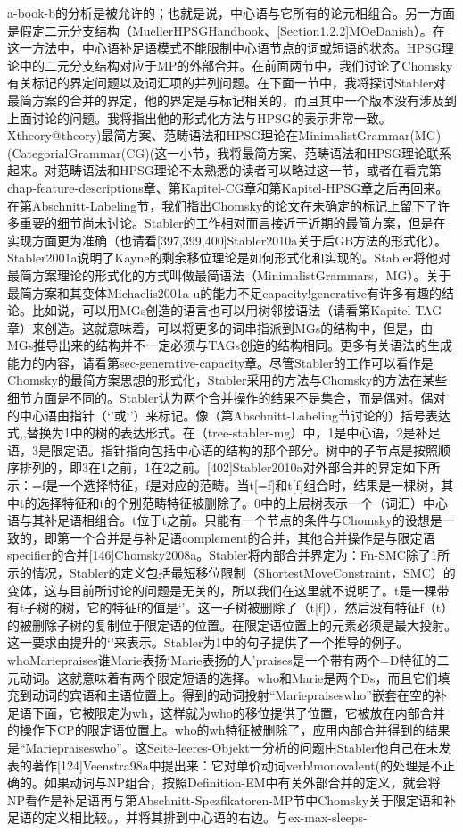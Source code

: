 a-book-b的分析是被允许的；也就是说，中心语与它所有的论元相组合。另一方面是假定二元分支结构（MuellerHPSGHandbook、[Section1.2.2]MOeDanish）。在这一方法中，中心语补足语模式不能限制中心语节点的词或短语的状态。HPSG理论中的二元分支结构对应于MP的外部合并。在前面两节中，我们讨论了Chomsky有关标记的界定问题以及词汇项的并列问题。在下面一节中，我将探讨Stabler对最简方案的合并的界定，他的界定是与标记相关的，而且其中一个版本没有涉及到上面讨论的问题。我将指出他的形式化方法与HPSG的表示非常一致。Xtheory@theory)最简方案、范畴语法和HPSG理论在MinimalistGrammar(MG)(CategorialGrammar(CG)(这一小节，我将最简方案、范畴语法和HPSG理论联系起来。对范畴语法和HPSG理论不太熟悉的读者可以略过这一节，或者在看完第chap-feature-descriptions章、第Kapitel-CG章和第Kapitel-HPSG章之后再回来。在第Abschnitt-Labeling节，我们指出Chomsky的论文在未确定的标记上留下了许多重要的细节尚未讨论。Stabler的工作相对而言接近于近期的最简方案，但是在实现方面更为准确（也请看[397,399,400]Stabler2010a关于后GB方法的形式化）。Stabler2001a说明了Kayne的剩余移位理论是如何形式化和实现的。Stabler将他对最简方案理论的形式化的方式叫做最简语法（MinimalistGrammars，MG）。关于最简方案和其变体Michaelis2001a-u的能力不足capacity!generative有许多有趣的结论。比如说，可以用MGs创造的语言也可以用树邻接语法（请看第Kapitel-TAG章）来创造。这就意味着，可以将更多的词串指派到MGs的结构中，但是，由MGs推导出来的结构并不一定必须与TAGs创造的结构相同。更多有关语法的生成能力的内容，请看第sec-generative-capacity章。尽管Stabler的工作可以看作是Chomsky的最简方案思想的形式化，Stabler采用的方法与Chomsky的方法在某些细节方面是不同的。Stabler认为两个合并操作的结果不是集合，而是偶对。偶对的中心语由指针（`'或`'）来标记。像（第Abschnitt-Labeling节讨论的）括号表达式,,替换为1中的树的表达形式。在（tree-stabler-mg）中，1是中心语，2是补足语，3是限定语。指针指向包括中心语的结构的那个部分。树中的子节点是按照顺序排列的，即3在1之前，1在2之前。[402]Stabler2010a对外部合并的界定如下所示：=f是一个选择特征，f是对应的范畴。当t[=f]和t[f]组合时，结果是一棵树，其中t的选择特征和t的个别范畴特征被删除了。0中的上层树表示一个（词汇）中心语与其补足语相组合。t位于t之前。只能有一个节点的条件与Chomsky的设想是一致的，即第一个合并是与补足语complement的合并，其他合并操作是与限定语specifier的合并[146]Chomsky2008a。Stabler将内部合并界定为：Fn-SMC除了1所示的情况，Stabler的定义包括最短移位限制（ShortestMoveConstraint，SMC）的变体，这与目前所讨论的问题是无关的，所以我们在这里就不说明了。t是一棵带有t子树的树，它的特征f的值是`'。这一子树被删除了（t[f]），然后没有特征f（t）的被删除子树的复制位于限定语的位置。在限定语位置上的元素必须是最大投射。这一要求由提升的`'来表示。Stabler为1中的句子提供了一个推导的例子。whoMariepraises谁Marie表扬`Marie表扬的人'praises是一个带有两个=D特征的二元动词。这就意味着有两个限定短语的选择。who和Marie是两个Ds，而且它们填充到动词的宾语和主语位置上。得到的动词投射“Mariepraiseswho”嵌套在空的补足语下面，它被限定为wh，这样就为who的移位提供了位置，它被放在内部合并的操作下CP的限定语位置上。who的wh特征被删除了，应用内部合并得到的结果是“Mariepraiseswho”。这Seite-leeres-Objekt一分析的问题由Stabler他自己在未发表的著作[124]Veenstra98a中提出来：它对单价动词verb!monovalent(的处理是不正确的。如果动词与NP组合，按照Definition-EM中有关外部合并的定义，就会将NP看作是补足语再与第Abschnitt-Spezfikatoren-MP节中Chomsky关于限定语和补足语的定义相比较。，并将其排到中心语的右边。与ex-max-sleeps-